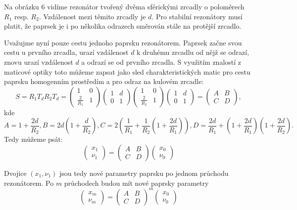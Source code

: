 \documentclass[a4paper,12pt]{article}
\begin{document}
Na obrázku 6 vidíme rezonátor tvořený dvěma sférickými zrcadly o poloměrech $R_1$ resp. $R_2$. Vzdálenost mezi těmito zrcadly je $d$. Pro stabilní rezonátory musí platit, že paprsek je i po několika odrazech směrován stále na protější zrcadlo.

Uvažujme nyní pouze cestu jednoho paprsku rezonátorem. Paprsek začne svou cestu u prvního zrcadla, urazí vzdálenost $d$ k druhému zrcadlu od nějž se odrazí, znovu urazí vzdálenost $d$ a odrazí se od prvního zrcadla. S využitím znalostí z maticové optiky toto můžeme zapsat jako sled charakteristických matic pro cestu paprsku homogenním prostředím a pro odraz na kulovém zrcadle:
$$
S = R_1T_dR_2T_d = 
\begin{pmatrix}
1 & 0 \\
\frac{2}{R_1} & 1
\end{pmatrix}\begin{pmatrix}
1 & d \\
0 & 1
\end{pmatrix}\begin{pmatrix}
1 & 0 \\
\frac{2}{R_2} & 1
\end{pmatrix}\begin{pmatrix}
1 & d \\
0 & 1
\end{pmatrix} = \begin{pmatrix}
A & B\\
C & D
\end{pmatrix},$$ kde
$$
A=1+\frac{2d}{R_2},
B=2d(1+\frac{d}{R_2}),
C=2(\frac{1}{R_1} + \frac{1}{R_2}(1+\frac{2d}{R_1})),
D=\frac{2d}{R_1} + (1 + \frac{2d}{R_1})(1+\frac{2d}{R_2}).
$$
Tedy můžeme psát:
$$
\begin{pmatrix}
x_1 \\
\nu_1
\end{pmatrix} = \begin{pmatrix}
A & B\\
C & D
\end{pmatrix}\begin{pmatrix}
x_0 \\
\nu_0
\end{pmatrix}
$$

Dvojice $(x_1, \nu_1)$ jsou tedy nové parametry paprsku po jednom průchodu rezonátorem. Po $m$ průchodech budou mít nové paprsky parametry
$$
\begin{pmatrix}
x_m \\
\nu_m
\end{pmatrix} = \begin{pmatrix}
A & B\\
C & D
\end{pmatrix}^m\begin{pmatrix}
x_0 \\
\nu_0
\end{pmatrix}
$$
\end{document}
